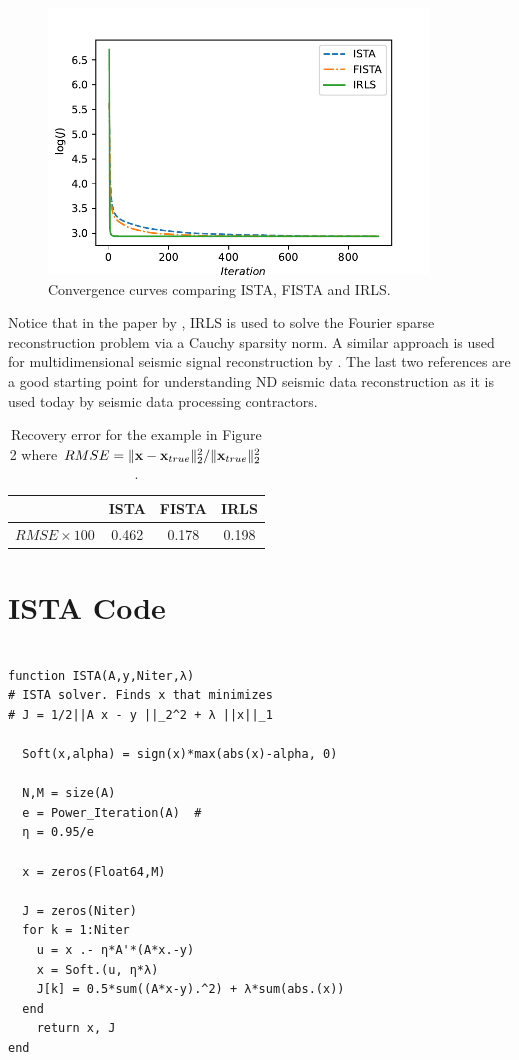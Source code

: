 \documentclass[11pt, oneside]{article}  	%
\begin{document}
\begin{figure}[htbp]
  \centering
  \includegraphics[width=0.9\textwidth]{convergence.pdf} 
  \caption{Convergence curves comparing ISTA, FISTA and IRLS.}
  \label{fig:e2}
\end{figure}
Notice that in the paper by \cite{Sacchi}, IRLS is used to solve the Fourier sparse reconstruction problem
via a Cauchy sparsity norm. A similar approach is used for multidimensional seismic signal reconstruction 
by \cite{Zwartjes}. The last two references are a good starting point for understanding ND seismic data reconstruction as it is used today by seismic data processing contractors. 
\begin{table}[htp]
\begin{center}
\begin{tabular}{|c|c|c|c|} \hline
  & ISTA & FISTA & IRLS\\ \hline
 $RMSE \times 100$ & 0.462& 0.178 & 0.198\\  \hline
\end{tabular}
\end{center}
\caption{Recovery error for the example in Figure  2 where $RMSE = \| {\bf x} - {\bf x}_{true} \|_2^2 / \| {\bf x}_{true} \|_2^2$.}
\label{default}
\end{table}

\section{ISTA Code}

\begin{tcolorbox}
\begin{verbatim}

function ISTA(A,y,Niter,λ)
# ISTA solver. Finds x that minimizes 
# J = 1/2||A x - y ||_2^2 + λ ||x||_1  
   
  Soft(x,alpha) = sign(x)*max(abs(x)-alpha, 0)

  N,M = size(A)
  e = Power_Iteration(A)  #
  η = 0.95/e
  
  x = zeros(Float64,M)
  
  J = zeros(Niter)
  for k = 1:Niter
    u = x .- η*A'*(A*x.-y)
    x = Soft.(u, η*λ)
    J[k] = 0.5*sum((A*x-y).^2) + λ*sum(abs.(x))
  end
    return x, J
end
\end{verbatim}
\end{tcolorbox}




\end{document}
